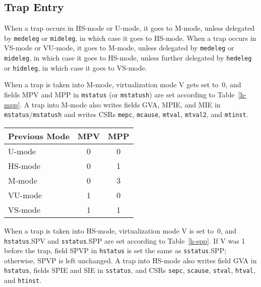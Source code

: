 \subsection{Trap Entry}

When a trap occurs in HS-mode or U-mode, it goes to M-mode, unless
delegated by {\tt medeleg} or {\tt mideleg}, in which case it goes to HS-mode.
When a trap occurs in VS-mode or VU-mode, it goes to M-mode, unless
delegated by {\tt medeleg} or {\tt mideleg}, in which case it goes to HS-mode,
unless further delegated by {\tt hedeleg} or {\tt hideleg}, in which case it
goes to VS-mode.

When a trap is taken into M-mode, virtualization mode V gets set to~0,
and fields MPV and MPP in {\tt mstatus}
(or {\tt mstatush}) are set according to
Table~\ref{h-mpp}.
A trap into M-mode also writes fields GVA, MPIE, and MIE in
{\tt mstatus}/{\tt mstatush} and writes CSRs {\tt mepc}, {\tt mcause},
{\tt mtval}, {\tt mtval2}, and {\tt mtinst}.

\begin{table*}[h!]
\begin{center}
\begin{tabular}{|l|c|c|}
  \hline
  Previous Mode & MPV & MPP \\ \hline
  U-mode        & 0   & 0   \\
  HS-mode       & 0   & 1   \\
  M-mode        & 0   & 3   \\ \hline
  VU-mode       & 1   & 0   \\
  VS-mode       & 1   & 1   \\ \hline
\end{tabular}
\end{center}
\caption{Value of {\tt mstatus}/{\tt mstatush} fields MPV and MPP after a trap into M-mode.
Upon trap return, MPV is ignored when MPP=3.}
\label{h-mpp}
\end{table*}

When a trap is taken into HS-mode, virtualization mode V is set to~0,
and {\tt hstatus}.SPV and {\tt sstatus}.SPP are
set according to Table~\ref{h-spp}.
If V was 1 before the trap, field SPVP in {\tt hstatus} is set the same as
{\tt sstatus}.SPP;
otherwise, SPVP is left unchanged.
A trap into HS-mode also writes field GVA in {\tt hstatus}, fields
SPIE and SIE in {\tt sstatus}, and CSRs {\tt sepc}, {\tt scause},
{\tt stval}, {\tt htval}, and {\tt htinst}.

